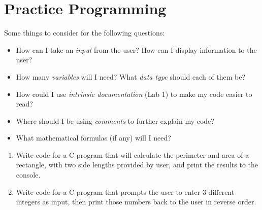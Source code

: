 \documentclass{pass}
\begin{document}
\section*{Practice Programming}
Some things to consider for the following questions:
	\begin{itemize}
	\item How can I take an \textit{input} from the user? How can I display information to the user?
	\item How many \textit{variables} will I need? What \textit{data type} should each of them be?
	\item How could I use \textit{intrinsic documentation} (Lab 1) to make my code easier to read?
	\item Where should I be using \textit{comments} to further explain my code?
	\item What mathematical formulas (if any) will I need?\\[8pt]
	\end{itemize}
\begin{enumerate}[resume]
\item Write code for a C program that will calculate the perimeter and area of a rectangle, with two side lengths provided by user, and print the results to the console.\\[8pt]

\item Write code for a C program that prompts the user to enter 3 different integers as input, then print those numbers back to the user in reverse order.
\end{enumerate}
\end{document}
